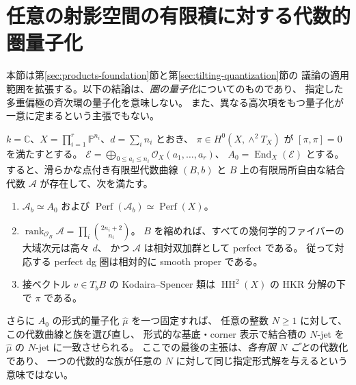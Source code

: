 \section{任意の射影空間の有限積に対する代数的圏量子化}
\label{sec:restored-finite-products}

本節は第\ref{sec:products-foundation}節と第\ref{sec:tilting-quantization}節の
議論の適用範囲を拡張する。以下の結論は、\emph{圏の量子化}についてのものであり、
指定した多重偏極の斉次環の量子化を意味しない。
また、異なる高次項をもつ量子化が一意に定まるという主張でもない。

\begin{theorem}[有限積への代数的量子化の拡張]\label{thm:restored-product-quant}
$k=\mathbb C$、$X=\prod_{i=1}^r\mathbb P^{n_i}$、$d=\sum_i n_i$ とおき、
$\pi\in H^0(X,\wedge^2T_X)$ が $[\pi,\pi]=0$ を満たすとする。
$\mathcal E=\bigoplus_{0\le a_i\le n_i}\mathcal O_X(a_1,\ldots,a_r)$、
$A_0=\operatorname{End}_X(\mathcal E)$ とする。
すると、滑らかな点付き有限型代数曲線 $(B,b)$ と
$B$ 上の有限局所自由な結合代数 $\mathcal A$ が存在して、次を満たす。
\begin{enumerate}
\item $\mathcal A_b\simeq A_0$ および
$\operatorname{Perf}(\mathcal A_b)\simeq\operatorname{Perf}(X)$。
\item $\operatorname{rank}_{\mathcal O_B}\mathcal A
=\prod_i\binom{2n_i+2}{n_i}$。
$B$ を縮めれば、すべての幾何学的ファイバーの大域次元は高々 $d$、
かつ $\mathcal A$ は相対双加群として perfect である。
従って対応する perfect dg 圏は相対的に smooth proper である。
\item 接ベクトル $v\in T_bB$ の Kodaira--Spencer 類は
$\operatorname{HH}^2(X)$ の HKR 分解の下で $\pi$ である。
\end{enumerate}
さらに $A_0$ の形式的量子化 $\widehat\mu$ を一つ固定すれば、
任意の整数 $N\ge1$ に対して、この代数曲線と族を選び直し、
形式的な基底・corner 表示で結合積の $N$-jet を
$\widehat\mu$ の $N$-jet に一致させられる。
ここでの最後の主張は、\emph{各有限 $N$ ごと}の代数化であり、
一つの代数的な族が任意の $N$ に対して同じ指定形式解を与えるという意味ではない。
\end{theorem}
